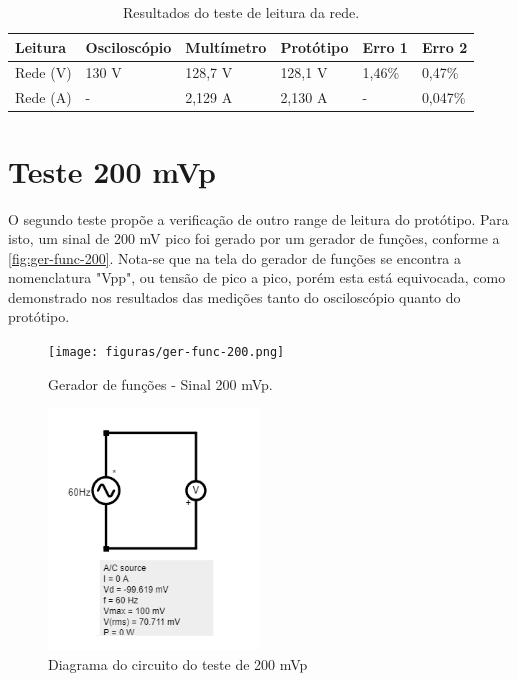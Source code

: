\begin{table}[!ht]
    \centering
    \caption{Resultados do teste de leitura da rede.}
    \label{tab:resultados-01}
    \begin{tabular}{ l l l l l l }
        \hline
        \textbf{Leitura} & \textbf{Osciloscópio} & \textbf{Multímetro} & \textbf{Protótipo}  & \textbf{Erro 1}  & \textbf{Erro 2}  \\ \hline
        Rede (V)         & 130 V                 & 128,7 V             & 128,1 V             & 1,46\%           & 0,47\%           \\ 
        Rede (A)         & -                     & 2,129 A             & 2,130 A             & -                & 0,047\%          \\ \hline
    \end{tabular}
    \fonte{}
\end{table}



\section{Teste 200 mVp}\label{teste-200mv}

O segundo teste propõe a verificação de outro range de leitura do protótipo. Para isto, um sinal de 200 mV pico foi gerado por um gerador de funções, conforme a \autoref{fig:ger-func-200}. Nota-se que na tela do gerador de funções se encontra a nomenclatura "Vpp", ou tensão de pico a pico, porém esta está equivocada, como demonstrado nos resultados das medições tanto do osciloscópio quanto do protótipo.

\begin{figure}[htb!]
    \caption{Gerador de funções - Sinal 200 mVp.}
    \label{fig:ger-func-200}
    \texttt{[image: figuras/ger-func-200.png]}
    \fonte{}
\end{figure}

\begin{figure}[htb!]
    \caption{Diagrama do circuito do teste de 200 mVp}
    \label{fig:circ-200}
    \includegraphics[width=0.5\textwidth]{figuras/circ-200-falstad.png}
    \fonte{}
\end{figure}

